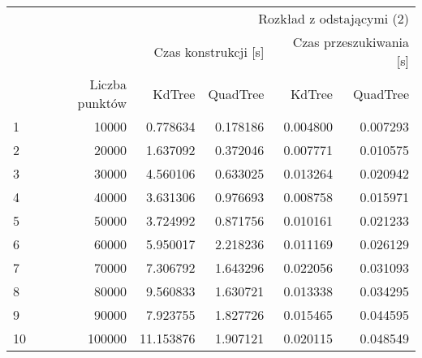 \begin{tabular}{lrrrrr}
\toprule
 & \multicolumn{5}{r}{Rozkład z odstającymi (2)} \\
 &  & \multicolumn{2}{r}{Czas konstrukcji [s]} & \multicolumn{2}{r}{Czas przeszukiwania [s]} \\
 & Liczba punktów & KdTree & QuadTree & KdTree & QuadTree \\
\midrule
1 & 10000 & 0.778634 & 0.178186 & 0.004800 & 0.007293 \\
2 & 20000 & 1.637092 & 0.372046 & 0.007771 & 0.010575 \\
3 & 30000 & 4.560106 & 0.633025 & 0.013264 & 0.020942 \\
4 & 40000 & 3.631306 & 0.976693 & 0.008758 & 0.015971 \\
5 & 50000 & 3.724992 & 0.871756 & 0.010161 & 0.021233 \\
6 & 60000 & 5.950017 & 2.218236 & 0.011169 & 0.026129 \\
7 & 70000 & 7.306792 & 1.643296 & 0.022056 & 0.031093 \\
8 & 80000 & 9.560833 & 1.630721 & 0.013338 & 0.034295 \\
9 & 90000 & 7.923755 & 1.827726 & 0.015465 & 0.044595 \\
10 & 100000 & 11.153876 & 1.907121 & 0.020115 & 0.048549 \\
\bottomrule
\end{tabular}
